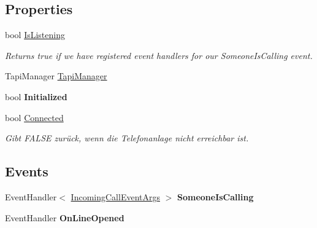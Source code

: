 \subsection*{Properties}
\begin{DoxyCompactItemize}
\item 
bool \hyperlink{class_agfeo_1_1_fon_service_a70b4da6e6356227bee4d3026b01f8a10}{Is\+Listening}
\begin{DoxyCompactList}\small\item\em Returns true if we have registered event handlers for our Someone\+Is\+Calling event. \end{DoxyCompactList}\item 
Tapi\+Manager \hyperlink{class_agfeo_1_1_fon_service_a67a3f32200a266732ce8d3e16e66df96}{Tapi\+Manager}
\item 
bool {\bfseries Initialized}\hypertarget{class_agfeo_1_1_fon_service_ac55f86e79cf55322045a2624f837665c}{}\label{class_agfeo_1_1_fon_service_ac55f86e79cf55322045a2624f837665c}

\item 
bool \hyperlink{class_agfeo_1_1_fon_service_a363b9eae2fffd3b2d9465826e30515a4}{Connected}
\begin{DoxyCompactList}\small\item\em Gibt F\+A\+L\+SE zurück, wenn die Telefonanlage nicht erreichbar ist. \end{DoxyCompactList}\end{DoxyCompactItemize}
\subsection*{Events}
\begin{DoxyCompactItemize}
\item 
Event\+Handler$<$ \hyperlink{class_agfeo_1_1_incoming_call_event_args}{Incoming\+Call\+Event\+Args} $>$ {\bfseries Someone\+Is\+Calling}\hypertarget{class_agfeo_1_1_fon_service_af941a53a19a13b84a2f3437b595b8eec}{}\label{class_agfeo_1_1_fon_service_af941a53a19a13b84a2f3437b595b8eec}

\item 
Event\+Handler {\bfseries On\+Line\+Opened}\hypertarget{class_agfeo_1_1_fon_service_a564220654d2069a117bab83f9c83eab1}{}\label{class_agfeo_1_1_fon_service_a564220654d2069a117bab83f9c83eab1}

\end{DoxyCompactItemize}


